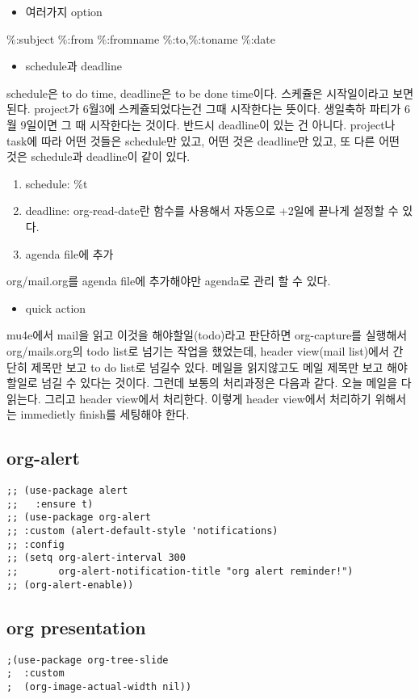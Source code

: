 \documentclass[11pt]{article}
\begin{document}
\begin{itemize}
\item 여러가지 option
\end{itemize}
\%:subject
\%:from
\%:fromname
\%:to,\%:toname
\%:date 

\begin{itemize}
\item schedule과 deadline
\end{itemize}
schedule은 to do time, deadline은 to be done time이다. 스케쥴은 시작일이라고 보면 된다. project가 6월3에 스케쥴되었다는건 그때 시작한다는 뜻이다. 생일축하 파티가 6월 9일이면 그 때 시작한다는 것이다. 반드시 deadline이 있는 건 아니다. project나 task에 따라 어떤 것들은 schedule만 있고, 어떤 것은 deadline만 있고, 또 다른 어떤 것은 schedule과 deadline이 같이 있다.
\begin{enumerate}
\item schedule: \%t
\item deadline: org-read-date란 함수를 사용해서 자동으로 +2일에 끝나게 설정할 수 있다.

\item agenda file에 추가
\end{enumerate}
org/mail.org를 agenda file에 추가해야만 agenda로 관리 할 수 있다.

\begin{itemize}
\item quick action
\end{itemize}
mu4e에서 mail을 읽고 이것을 해야할일(todo)라고 판단하면 org-capture를 실행해서 org/mails.org의 todo list로 넘기는 작업을 했었는데, header view(mail list)에서 간단히 제목만 보고 to do list로 넘길수 있다. 메일을 읽지않고도 메일 제목만 보고 해야 할일로 넘길 수 있다는 것이다. 그런데 보통의 처리과정은 다음과 같다. 오늘 메일을 다 읽는다. 그리고 header view에서 처리한다. 이렇게 header view에서 처리하기 위해서는 immedietly finish를 세팅해야 한다.
\subsection*{org-alert}
\label{sec:org89f401e}
\begin{verbatim}
;; (use-package alert
;;   :ensure t)
;; (use-package org-alert
;; :custom (alert-default-style 'notifications)
;; :config
;; (setq org-alert-interval 300
;;       org-alert-notification-title "org alert reminder!")
;; (org-alert-enable))
\end{verbatim}
\subsection*{org presentation}
\label{sec:orgbd58436}
\begin{verbatim}
;(use-package org-tree-slide
;  :custom
;  (org-image-actual-width nil))

\end{verbatim}
\end{document}
